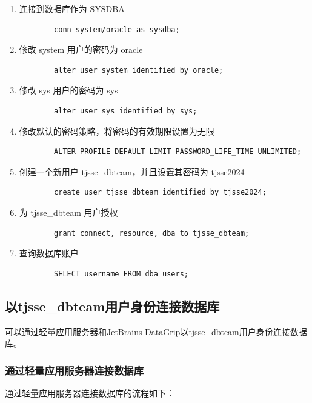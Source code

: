 \begin{enumerate}
	\item 连接到数据库作为 SYSDBA
	\begin{verbatim}
		conn system/oracle as sysdba;
	\end{verbatim}
	\item 修改 system 用户的密码为 oracle
	\begin{verbatim}
		alter user system identified by oracle;
	\end{verbatim}
	\item 修改 sys 用户的密码为 sys
	\begin{verbatim}
		alter user sys identified by sys;
	\end{verbatim}
	\item 修改默认的密码策略，将密码的有效期限设置为无限
	\begin{verbatim}
		ALTER PROFILE DEFAULT LIMIT PASSWORD_LIFE_TIME UNLIMITED;
	\end{verbatim}
	\item 创建一个新用户 tjsse\_dbteam，并且设置其密码为 tjsse2024
	\begin{verbatim}
		create user tjsse_dbteam identified by tjsse2024;
	\end{verbatim}
	\item 为 tjsse\_dbteam 用户授权
	\begin{verbatim}
		grant connect, resource, dba to tjsse_dbteam;
	\end{verbatim}
	\item 查询数据库账户
	\begin{verbatim}
		SELECT username FROM dba_users;
	\end{verbatim}
\end{enumerate}

\subsection{以tjsse\_dbteam用户身份连接数据库}

可以通过轻量应用服务器和JetBrains DataGrip以tjsse\_dbteam用户身份连接数据库。

\subsubsection{通过轻量应用服务器连接数据库}

通过轻量应用服务器连接数据库的流程如下：

